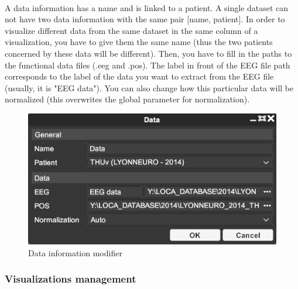 \documentclass[a4paper]{article}
\begin{document}
\paragraph{} A data information has a name and is linked to a patient. A single dataset can not have two data information with the same pair [name, patient]. In order to visualize different data from the same dataset in the same column of a visualization, you have to give them the same name (thus the two patients concerned by these data will be different). Then, you have to fill in the paths to the functional data files (.eeg and .pos). The label in front of the EEG file path corresponds to the label of the data you want to extract from the EEG file (usually, it is "EEG data"). You can also change how this particular data will be normalized (this overwrites the global parameter for normalization).
\begin{figure}[H]
\begin{center}
\includegraphics[scale=0.5]{DataInfoModifier.png}
\end{center}
\caption{\label{dataInfoModifierUI}Data information modifier}
\end{figure}
\subsubsection{Visualizations management}
\end{document}
